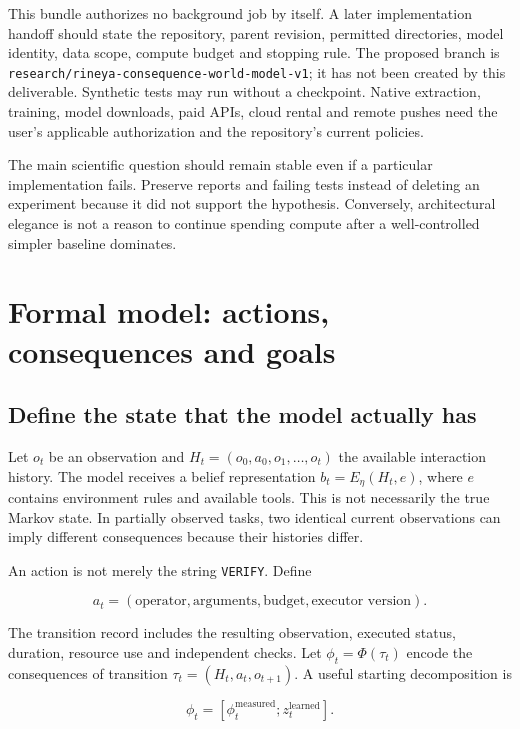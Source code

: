 \documentclass[
  11pt,
  a4paper,
]{article}
\begin{document}
This bundle authorizes no background job by itself. A later
implementation handoff should state the repository, parent revision,
permitted directories, model identity, data scope, compute budget and
stopping rule. The proposed branch is
\texttt{research/rineya-consequence-world-model-v1}; it has not been
created by this deliverable. Synthetic tests may run without a
checkpoint. Native extraction, training, model downloads, paid APIs,
cloud rental and remote pushes need the user's applicable authorization
and the repository's current policies.

The main scientific question should remain stable even if a particular
implementation fails. Preserve reports and failing tests instead of
deleting an experiment because it did not support the hypothesis.
Conversely, architectural elegance is not a reason to continue spending
compute after a well-controlled simpler baseline dominates.

\section{Formal model: actions, consequences and
goals}\label{formal-model-actions-consequences-and-goals}

\subsection{Define the state that the model actually
has}\label{define-the-state-that-the-model-actually-has}

Let \(o_t\) be an observation and \(H_t=(o_0,a_0,o_1,\ldots,o_t)\) the
available interaction history. The model receives a belief
representation \(b_t=E_\eta(H_t,e)\), where \(e\) contains environment
rules and available tools. This is not necessarily the true Markov
state. In partially observed tasks, two identical current observations
can imply different consequences because their histories differ.

An action is not merely the string \texttt{VERIFY}. Define

\[
a_t=(\text{operator},\text{arguments},\text{budget},\text{executor version}).
\]

The transition record includes the resulting observation, executed
status, duration, resource use and independent checks. Let
\(\phi_t=\Phi(\tau_t)\) encode the consequences of transition
\(\tau_t=(H_t,a_t,o_{t+1})\). A useful starting decomposition is

\[
\phi_t=[\phi_t^{\mathrm{measured}};z_t^{\mathrm{learned}}].
\]
\end{document}
